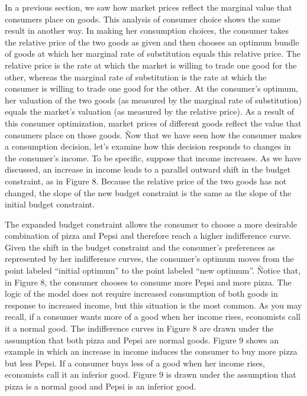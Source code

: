 In a previous section, we saw how market prices reflect the marginal value that consumers place on goods. This
analysis of consumer choice shows the same result in another way. In making her consumption choices, the consumer
takes the relative price of the two goods as given and then chooses an optimum bundle of goods at which her marginal
rate of substitution equals this relative price. The relative price is the rate at which the market is willing to
trade one good for the other, whereas the marginal rate of substitution is the rate at which the consumer is willing
to trade one good for the other. At the consumer's optimum, her valuation of the two goods (as measured by the
marginal rate of substitution) equals the market's valuation (as measured by the relative price). As a result of this
consumer optimization, market prices of different goods reflect the value that consumers place on those goods. \v

Now that we have seen how the consumer makes a consumption decision, let's examine how this decision responds to
changes in the consumer's income. To be specific, suppose that income increases. As we have discussed, an increase in
income leads to a parallel outward shift in the budget constraint, as in Figure 8. Because the relative price of the
two goods has not changed, the slope of the new budget constraint is the same as the slope of the initial budget
constraint.


The expanded budget constraint allows the consumer to choose a more desirable combination of pizza and Pepsi and
therefore reach a higher indifference curve. Given the shift in the budget constraint and the consumer's preferences
as represented by her indifference curves, the consumer's optimum moves from the point labeled ``initial optimum'' to
the point labeled ``new optimum''. \v

Notice that, in Figure 8, the consumer chooses to consume more Pepsi and more pizza. The logic of the model does not
require increased consumption of both goods in response to increased income, but this situation is the most common.
As you may recall, if a consumer wants more of a good when her income rises, economists call it a normal good. The
indifference curves in Figure 8 are drawn under the assumption that both pizza and Pepsi are normal goods. Figure 9
shows an example in which an increase in income induces the consumer to buy more pizza but less Pepsi. If a consumer
buys less of a good when her income rises, economists call it an inferior good. Figure 9 is drawn under the
assumption that pizza is a normal good and Pepsi is an inferior good.

